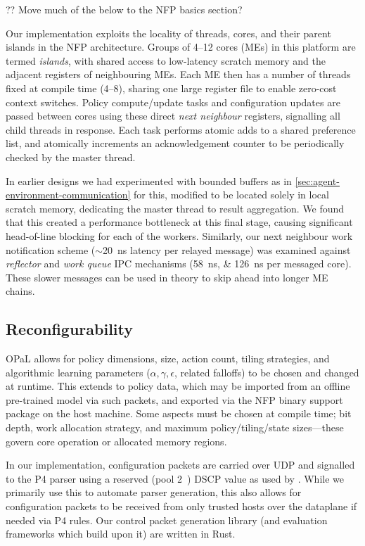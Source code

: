 \documentclass[sigconf,natbib=false]{acmart}
\newcommand{\approachshort}{OPaL}
\begin{document}
?? Move much of the below to the NFP basics section?

Our implementation exploits the locality of threads, cores, and their parent islands in the NFP architecture.
Groups of \numrange{4}{12} cores (MEs) in this platform are termed \emph{islands}, with shared access to low-latency scratch memory and the adjacent registers of neighbouring MEs.
Each ME then has a number of threads fixed at compile time (\numrange{4}{8}), sharing one large register file to enable zero-cost context switches.
Policy compute/update tasks and configuration updates are passed between cores using these direct \emph{next neighbour} registers, signalling all child threads in response.
Each task performs atomic adds to a shared preference list, and atomically increments an acknowledgement counter to be periodically checked by the master thread.

In earlier designs we had experimented with bounded buffers as in \cref{sec:agent-environment-communication} for this, modified to be located solely in local scratch memory, dedicating the master thread to result aggregation.
We found that this created a performance bottleneck at this final stage, causing significant head-of-line blocking for each of the workers.
Similarly, our next neighbour work notification scheme ($\sim$\SI{20}{\nano\second} latency per relayed message) was examined against \emph{reflector} and \emph{work queue} IPC mechanisms (\SIlist{58;126}{\nano\second} per messaged core).
These slower messages can be used in theory to skip ahead into longer ME chains.

\subsection{Reconfigurability}
\approachshort{} allows for policy dimensions, size, action count, tiling strategies, and algorithmic learning parameters ($\alpha, \gamma, \epsilon$, related falloffs) to be chosen and changed at runtime.
This extends to policy data, which may be imported from an offline pre-trained model via such packets, and exported via the NFP binary support package on the host machine.
Some aspects must be chosen at compile time; bit depth, work allocation strategy, and maximum policy/tiling/state sizes---these govern core operation or allocated memory regions.

In our implementation, configuration packets are carried over UDP and signalled to the P4 parser using a reserved (pool 2~\parencite{rfc2474}) DSCP value as used by \textcite{DBLP:conf/isca/LiLYCSH19}.
While we primarily use this to automate parser generation, this also allows for configuration packets to be received from only trusted hosts over the dataplane if needed via P4 rules.
Our control packet generation library (and evaluation frameworks which build upon it) are written in Rust.
\end{document}
